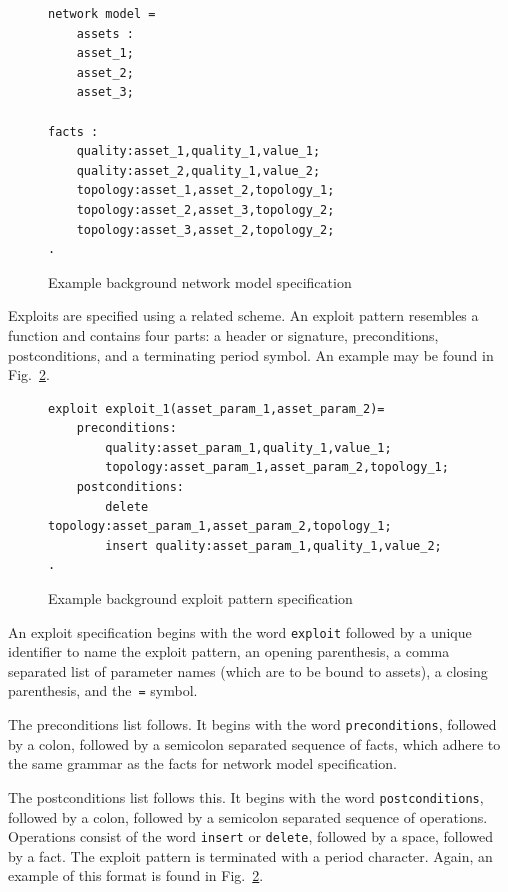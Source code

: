 \begin{figure}
\begin{lstlisting}
network model = 
    assets :
    asset_1;
    asset_2;
    asset_3;

facts :
	quality:asset_1,quality_1,value_1;
	quality:asset_2,quality_1,value_2;
	topology:asset_1,asset_2,topology_1;
	topology:asset_2,asset_3,topology_2;
    topology:asset_3,asset_2,topology_2;
.
\end{lstlisting}
\label{fig:nmspec}
\caption{Example background network model specification}
\end{figure}
Exploits are specified using a related scheme. An exploit pattern resembles a function
and contains four parts: a header or signature, preconditions, postconditions, and a
terminating period symbol. An example may be found in Fig.~\ref{fig:xpspec}.

\begin{figure}
\begin{lstlisting}
exploit exploit_1(asset_param_1,asset_param_2)=
    preconditions:
        quality:asset_param_1,quality_1,value_1;
        topology:asset_param_1,asset_param_2,topology_1;
    postconditions:
        delete topology:asset_param_1,asset_param_2,topology_1;
        insert quality:asset_param_1,quality_1,value_2;
.
\end{lstlisting}
\label{fig:xpspec}
\caption{Example background exploit pattern specification}
\end{figure}

An exploit specification begins with the word \texttt{exploit} followed by a
unique identifier to name the exploit pattern, an opening parenthesis, a comma separated
list of parameter names (which are to be bound to assets), a closing parenthesis, and 
the~\texttt{=} symbol.

The preconditions list follows. It begins with the word \texttt{preconditions}, followed
by a colon, followed by a semicolon separated sequence of facts, which adhere to the
same grammar as the facts for network model specification. 

The postconditions list follows this. It begins with the word \texttt{postconditions},
followed by a colon, followed by a semicolon separated sequence of operations. Operations
consist of the word \texttt{insert} or \texttt{delete}, followed by a space, followed by
a fact. The exploit pattern is terminated with a period character. Again, an
example of this format is found in Fig.~\ref{fig:xpspec}.

